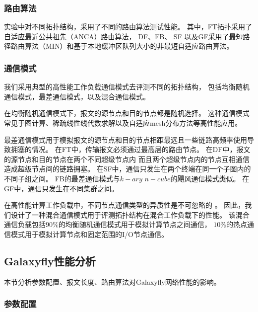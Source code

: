 \subsubsection{路由算法}
实验中对不同拓扑结构，采用了不同的路由算法测试性能。
其中，FT拓扑采用了自适应最近公共祖先（ANCA）路由算法，
DF、FB、 SF
以及GF采用了最短路径路由算法（MIN）和基于本地缓冲区队列大小的非最短自适应路由算法。

\subsubsection{通信模式}
我们采用典型的高性能工作负载通信模式去评测不同的拓扑结构，
包括均衡随机通信模式，最差通信模式，以及混合通信模式。

在均衡随机通信模式下，报文的源节点和目的节点都是随机选择。
这种通信模式常见于图计算、稀疏线性线代数求解以及自适应mesh分布方法等高性能应用。

最差通信模式用于模拟报文的源节点和目的节点相距最远且一些链路高频率使用导致拥塞的情况。
在FT中，传输报文必须通过最高层的路由节点。
在DF中，报文的源节点和目的节点在两个不同超级节点内
而且两个超级节点内的节点互相通信造成超级节点间的链路拥塞。
在SF中，通信只发生在两个终端在同一个子图内的不同子组之间。
FB的最差通信模式与$k-ary$ $n-cube$的飓风通信模式类似。
在GF中，通信只发生在不同集群之间。

在高性能计算工作负载中，不同节点通信类型的异质性是不可忽略的
 。
因此，我们设计了一种混合通信模式用于评测拓扑结构在混合工作负载下的性能。
该混合通信负载包括$90\%$的均衡随机通信模式用于模拟计算节点之间通信，
$10\%$的热点通信模式用于模拟计算节点和固定范围的I/O节点通信。

\subsection{Galaxyfly性能分析}
本节分析参数配置、报文长度、路由算法对Galaxyfly网络性能的影响。

\subsubsection{参数配置}

